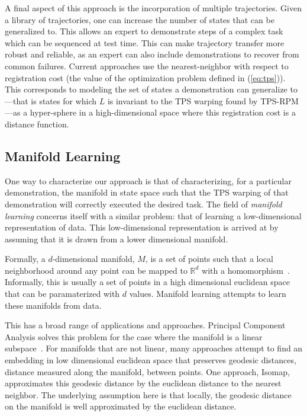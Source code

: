 A final aspect of this approach is the incorporation of multiple trajectories. Given a library of trajectories,
one can increase the number of states that can be generalized to. This allows an expert to demonstrate steps of a complex task
which can be sequenced at test time. This can make trajectory transfer more robust and reliable, as an expert can also
include demonstrations to recover from common failures. Current approaches use the nearest-neighbor with respect to registration
cost (the value of the optimization problem defined in (\ref{eq:tps})). This corresponds to modeling the set of states a demonstration
can generalize to---that is states for which $L$ is invariant to the TPS warping found by TPS-RPM---as a hyper-sphere 
in a high-dimensional space where this registration cost is a distance function.
\subsection{Manifold Learning}
One way to characterize our approach is that of characterizing, for a particular demonstration,
the manifold in state space such that the TPS warping of that demonstration will correctly executed 
the desired task. The field of \emph{manifold learning} concerns itself with a similar problem:
that of learning a low-dimensional representation of data. This low-dimensional representation 
is arrived at by assuming that it is drawn from a lower dimensional manifold.

Formally, a $d$-dimensional manifold, $M$, is a set of points such that a local neighborhood 
around any point can be mapped to $\mathbb{R}^d$ with a homomorphism~\cite{cayton2005algorithms}. Informally, this is usually 
a set of points in a high dimensional euclidean space that can be paramaterized with $d$ values.
Manifold learning attempts to learn these manifolds from data.

This has a broad range of applications and approaches. Principal Component Analysis solves
this problem for the case where the manifold is a linear subspace~\cite{jolliffe2005principal}.
For manifolds that are not linear, many approaches attempt to find an embedding in low dimensional
euclidean space that preserves geodesic distances, distance measured along the manifold, between points.
One approach, Isomap, approximates this geodesic distance by the euclidean distance to the nearest neighbor.
The underlying assumption here is that locally, the geodesic distance on the manifold is well approximated by the 
euclidean distance.


